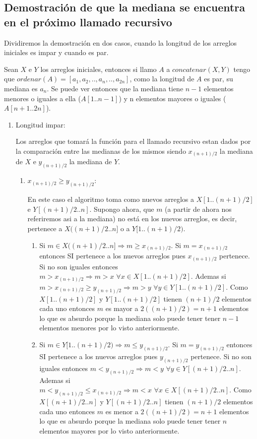 \documentclass[a4paper,10pt] {article}
\begin{document}
\subsection*{Demostraci\'on de que la mediana se encuentra en el pr\'oximo llamado recursivo}

Dividiremos la demostraci\'on en dos casos, cuando la longitud de los arreglos iniciales es impar y cuando es par.

Sean $X$ e $Y$ los arreglos iniciales, entonces si llamo $A$ a $concatenar(X,Y)$ tengo que $ordenar(A)=[a_{1},a_{2},..,a_{n},..,a_{2n}]$, como la longitud de $A$ es par, su mediana es $a_{n}$. Se puede ver entonces que la mediana tiene $n-1$ elementos menores o iguales a ella ($A[1..n-1]$) y n elementos mayores o iguales ($A[n+1..2n]$).

\begin{enumerate}
 \item Longitud impar:
  
Los arreglos que tomar\'a la funci\'on para el llamado recursivo estan dados por la comparaci\'on entre las medianas de los mismos siendo $x_{(n+1)/2}$ la mediana de $X$ e $y_{(n+1)/2}$ la mediana de $Y$.
\begin{enumerate}
\item $x_{(n+1)/2}\geq y_{(n+1)/2}$:

En este caso el algoritmo toma como nuevos arreglos a $X[1..(n+1)/2]$ e $Y[(n+1)/2..n]$. Supongo ahora, que $m$ (a partir de ahora nos referiremos asi a la mediana) no est\'a en los nuevos arreglos, es decir, pertenece a $X((n+1)/2..n]$ o a $Y[1..(n+1)/2)$.
\begin{enumerate}
\item
 Si $m \in X((n+1)/2..n] \Longrightarrow m \geq x_{(n+1)/2}$. Si $m=x_{(n+1)/2}$ entonces SI pertenece a los nuevos arreglos pues $x_{(n+1)/2}$ pertenece. Si no son iguales entonces $m>x_{(n+1)/2} \Longrightarrow m>x \,\,\forall x \in X[1..(n+1)/2]$. Ademas si $m>x_{(n+1)/2}\geq y_{(n+1)/2} \Longrightarrow m>y \,\,\forall y \in Y[1..(n+1)/2]$. Como $X[1..(n+1)/2]$ y $Y[1..(n+1)/2]$ tienen $(n+1)/2$ elementos cada uno entonces $m$ es mayor a $2((n+1)/2)=n+1$ elementos lo que es absurdo porque la mediana solo puede tener tener $n-1$ elementos menores por lo visto anteriormente.
\item
 Si $m \in Y[1..(n+1)/2) \Longrightarrow m \leq y_{(n+1)/2}$. Si $m=y_{(n+1)/2}$ entonces SI pertenece a los nuevos arreglos pues $y_{(n+1)/2}$ pertenece. Si no son iguales entonces $m<y_{(n+1)/2} \Longrightarrow m<y \,\,\forall y \in Y[(n+1)/2..n]$. Ademas si $m<y_{(n+1)/2}\leq x_{(n+1)/2} \Longrightarrow m<x \,\,\forall x \in X[(n+1)/2..n]$. Como $X[(n+1)/2..n]$ y $Y[(n+1)/2..n]$ tienen $(n+1)/2$ elementos cada uno entonces $m$ es menor a $2((n+1)/2)=n+1$ elementos lo que es absurdo porque la mediana solo puede tener tener $n$ elementos mayores por lo visto anteriormente.
\end{enumerate}


\end{enumerate}
\end{enumerate}
\end{document}
